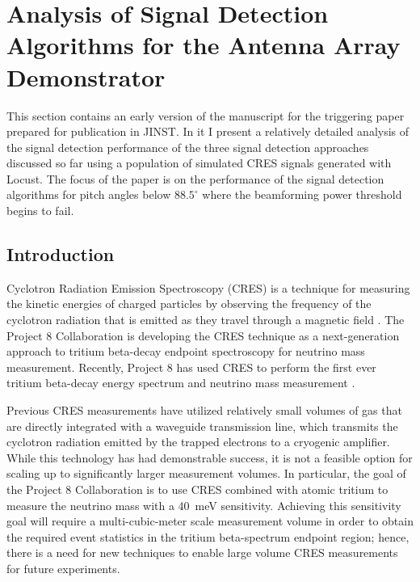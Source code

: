 \section{Analysis of Signal Detection Algorithms for the Antenna Array Demonstrator}
\label{sec:chap4-trigger-paper}
This section contains an early version of the manuscript for the triggering paper prepared for publication in JINST. In it I present a relatively detailed analysis of the signal detection performance of the three signal detection approaches discussed so far using a population of simulated CRES signals generated with Locust. The focus of the paper is on the performance of the signal detection algorithms for pitch angles below $88.5^\circ$ where the beamforming power threshold begins to fail.

\subsection{Introduction}
Cyclotron Radiation Emission Spectroscopy (CRES) is a technique for measuring the kinetic energies of charged particles by observing the frequency of the cyclotron radiation that is emitted as they travel through a magnetic field \cite{p8originalcres}.
The Project 8 Collaboration is developing the CRES technique as a next-generation approach to tritium beta-decay endpoint spectroscopy for neutrino mass measurement. Recently, Project 8 has used CRES to perform the first ever tritium beta-decay energy spectrum and neutrino mass measurement \cite{p8prl2023, p8prc2023}.

Previous CRES measurements have utilized relatively small volumes of gas that are directly integrated with a waveguide transmission line, which transmits the cyclotron radiation emitted by the trapped electrons to a cryogenic amplifier. While this technology has had demonstrable success, it is not a feasible option for scaling up to significantly larger measurement volumes. In particular, the goal of the Project 8 Collaboration is to use CRES combined with atomic tritium to measure the neutrino mass with a 40~meV sensitivity. Achieving this sensitivity goal will require a multi-cubic-meter scale measurement volume in order to obtain the required event statistics in the tritium beta-spectrum endpoint region; hence, there is a need for new techniques to enable large volume CRES measurements for future experiments.

